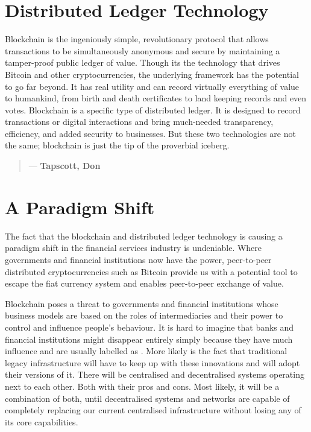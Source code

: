 \section{Distributed Ledger Technology}


Blockchain is the ingeniously simple, revolutionary protocol that allows transactions to be simultaneously anonymous and secure by maintaining a tamper-proof public ledger of value. Though its the technology that drives Bitcoin and other cryptocurrencies, the underlying framework has the potential to go far beyond. It has real utility and can record virtually everything of value to humankind, from birth and death certificates to land keeping records and even votes. 
Blockchain is a specific type of distributed ledger. It is designed to record transactions or digital interactions and bring much-needed transparency, efficiency, and added security to businesses. But these two technologies are not the same; blockchain is just the tip of the proverbial iceberg.

\begin{quotation}

  \textit{}
  \begin{flushright}
    \small{--- \textbf{Tapscott, Don}}
  \end{flushright}

\end{quotation}

\section{A Paradigm Shift}
The fact that the blockchain and distributed ledger technology is causing a paradigm shift in the financial services industry is undeniable. Where governments and financial institutions now have the power, peer-to-peer distributed cryptocurrencies such as Bitcoin provide us with a potential tool to escape the fiat currency system and enables peer-to-peer exchange of value. 

Blockchain poses a threat to governments and financial institutions whose business models are based on the roles of intermediaries and their power to control and influence people's behaviour. It is hard to imagine that banks and financial institutions might disappear entirely simply because they have much influence and are usually labelled as . More likely is the fact that traditional legacy infrastructure will have to keep up with these innovations and will adopt their versions of it. There will be centralised and decentralised systems operating next to each other. Both with their pros and cons. Most likely, it will be a combination of both, until decentralised systems and networks are capable of completely replacing our current centralised infrastructure without losing any of its core capabilities.\medskip


